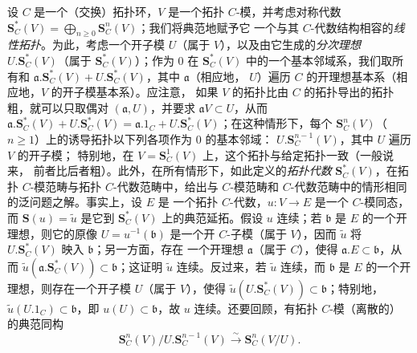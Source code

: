 \begin{env}[19.5.1]
\label{0.19.5.1-fr}
设 $C$ 是一个（交换）拓扑环，$V$ 是一个拓扑 $C$-模，并考虑对称代数
$\mathbf S_C^*(V)=\bigoplus_{n\geq0}\mathbf S_C^n(V)$；我们将典范地赋予它
一个与其 $C$-代数结构相容的\emph{线性拓扑}。为此，考虑一个开子模
$U$（属于 $V$），以及由它生成的\emph{分次理想}
$U.\mathbf S_C^*(V)$（属于 $\mathbf S_C^*(V)$）；作为 $0$ 在
$\mathbf S_C^*(V)$ 中的一个基本邻域系，我们取所有和
$\mathfrak a.\mathbf S_C^*(V)+U.\mathbf S_C^*(V)$，其中 $\mathfrak a$（相应地，
$U$）遍历 $C$ 的开理想基本系（相应地，$V$ 的开子模基本系）。应注意，
如果 $V$ 的拓扑比由 $C$ 的拓扑导出的拓扑粗，就可以只取偶对
$(\mathfrak a,U)$，并要求 $\mathfrak aV\subset U$，从而
$\mathfrak a.\mathbf S_C^*(V)+U.\mathbf S_C^*(V)
=\mathfrak a.1_C+U.\mathbf S_C^*(V)$；在这种情形下，每个
$\mathbf S_C^n(V)$（$n\geq1$）上的诱导拓扑以下列各项作为 $0$ 的基本邻域：
$U.\mathbf S_C^{n-1}(V)$，其中 $U$ 遍历 $V$ 的开子模；
特别地，在 $V=\mathbf S_C^1(V)$ 上，这个拓扑与给定拓扑一致（一般说来，
前者比后者粗）。此外，在所有情形下，如此定义的\emph{拓扑代数}
$\mathbf S_C^*(V)$，在拓扑 $C$-模范畴与拓扑 $C$-代数范畴中，给出与
$C$-模范畴和 $C$-代数范畴中的情形相同的泛问题之解。事实上，设 $E$ 是
一个拓扑 $C$-代数，$u:V\to E$ 是一个 $C$-模同态，而
$\mathbf S(u)=\widetilde u$ 是它到 $\mathbf S_C^*(V)$ 上的典范延拓。假设
$u$ 连续；若 $\mathfrak b$ 是 $E$ 的一个开理想，则它的原像
$U=u^{-1}(\mathfrak b)$ 是一个开 $C$-子模（属于 $V$），因而
$\widetilde u$ 将 $U.\mathbf S_C^*(V)$ 映入 $\mathfrak b$；另一方面，存在
一个开理想 $\mathfrak a$（属于 $C$），使得
$\mathfrak a.E\subset\mathfrak b$，从而
$\widetilde u(\mathfrak a.\mathbf S_C^*(V))\subset\mathfrak b$；这证明
$\widetilde u$ 连续。反过来，若 $\widetilde u$ 连续，而 $\mathfrak b$ 是
$E$ 的一个开理想，则存在一个开子模 $U$（属于 $V$），使得
$\widetilde u(U.\mathbf S_C^*(V))\subset\mathfrak b$；特别地，
$\widetilde u(U.1_C)\subset\mathfrak b$，即
$u(U)\subset\mathfrak b$，故 $u$ 连续。还要回顾，有拓扑 $C$-模（离散的）
的典范同构
\begin{equation}
\label{0.19.5.1.1-fr}
  \mathbf S_C^n(V)/U.\mathbf S_C^{n-1}(V)
  \xrightarrow{\sim}\mathbf S_C^n(V/U).
  \tag{19.5.1.1}
\end{equation}
\end{env}

